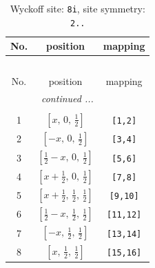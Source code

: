 \documentclass[fleqn,8pt]{jsarticle}
\begin{document}
\renewcommand{\arraystretch}{1.2}
\begin{longtable}{ccc}
\caption{Wyckoff site: {\tt 8i}, site symmetry: {\tt 2..}}
 \\
 \hline \hline
No. & position & mapping \\ \hline \endfirsthead

\multicolumn{2}{l}{\tablename\ \thetable{}} \\
 \hline \hline
No. & position & mapping \\ \hline \endhead

 \hline \hline
\multicolumn{2}{r}{\footnotesize\it continued ...} \\ \endfoot

 \hline \hline
\multicolumn{2}{r}{} \\ \endlastfoot

1 & $\left[ x,\, 0,\, \frac{1}{2} \right]$ & {\tt [1,2]} \\ \hline
2 & $\left[ - x,\, 0,\, \frac{1}{2} \right]$ & {\tt [3,4]} \\ \hline
3 & $\left[ \frac{1}{2} - x,\, 0,\, \frac{1}{2} \right]$ & {\tt [5,6]} \\ \hline
4 & $\left[ x + \frac{1}{2},\, 0,\, \frac{1}{2} \right]$ & {\tt [7,8]} \\ \hline
5 & $\left[ x + \frac{1}{2},\, \frac{1}{2},\, \frac{1}{2} \right]$ & {\tt [9,10]} \\ \hline
6 & $\left[ \frac{1}{2} - x,\, \frac{1}{2},\, \frac{1}{2} \right]$ & {\tt [11,12]} \\ \hline
7 & $\left[ - x,\, \frac{1}{2},\, \frac{1}{2} \right]$ & {\tt [13,14]} \\ \hline
8 & $\left[ x,\, \frac{1}{2},\, \frac{1}{2} \right]$ & {\tt [15,16]} \\
\end{longtable}
\renewcommand{\arraystretch}{1.2}
\end{document}
